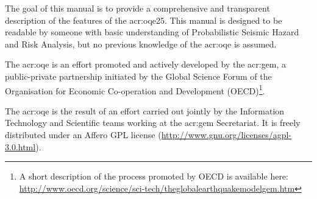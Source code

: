 The goal of this manual is to provide a comprehensive and transparent
description of the features of the \glsdesc{acr:oqe25}. This manual is
designed to be readable by someone with basic understanding of Probabilistic
Seismic Hazard and Risk Analysis, but no previous knowledge of the
\glsdesc{acr:oqe} is assumed.

The \glsdesc{acr:oqe} is an effort promoted and actively developed by the
\glsdesc{acr:gem}, a public-private partnership initiated by the
Global Science Forum of the Organisation for Economic Co-operation and Development
(OECD)\footnote{A short description of the process promoted by OECD is available here:\\\href{http://www.oecd.org/science/sci-tech/theglobalearthquakemodelgem.htm}{http://www.oecd.org/science/sci-tech/theglobalearthquakemodelgem.htm}}.

The \glsdesc{acr:oqe} is the result of an effort carried out jointly by the
Information Technology and Scientific teams working at the \gls{acr:gem} Secretariat.
It is freely distributed under an Affero GPL license
(\href{http://www.gnu.org/licenses/agpl-3.0.html}{http://www.gnu.org/licenses/agpl-3.0.html}).